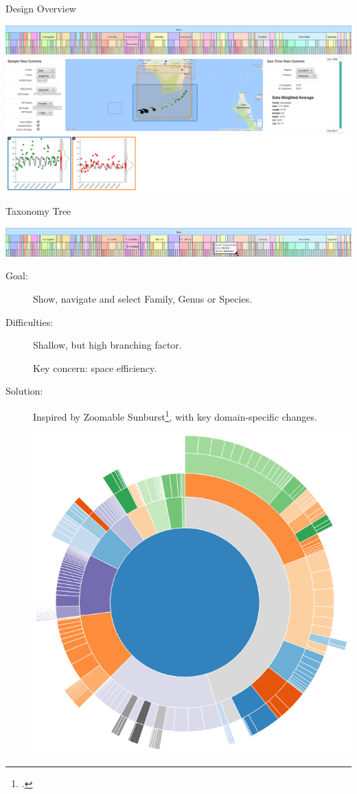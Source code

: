 \documentclass{beamer}
\begin{document}
\begin{frame}{Design Overview}

  \centerline{
  \includegraphics[width=\paperwidth]{./img/dviz.png}
  }

\end{frame}


\begin{frame}{Taxonomy Tree}

  \centerline{
  \includegraphics[width=\paperwidth]{./img/taxa.png}
  }

  \begin{description}

    \item[Goal:]  Show, navigate and select Family, Genus or Species.

    \item[Difficulties:]  Shallow, but high branching factor.

      Key concern:  space efficiency.

    \item[Solution:]  Inspired by Zoomable Sunburst\footcite{sunburst}, with
      key domain-specific changes.

      \includegraphics[width=.25\textwidth]{./img/taxa_sunburst.png}

  \end{description}

\end{frame}
\end{document}
